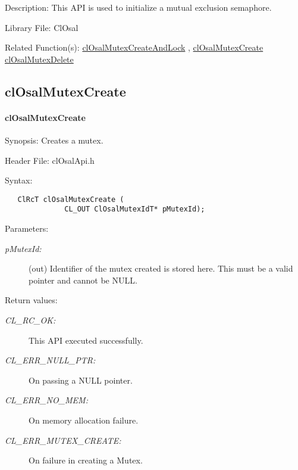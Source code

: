 \begin{Desc}
\item[Description:]This API is used to initialize a mutual exclusion semaphore.\end{Desc}
\begin{Desc}
\item[Library File:]Cl\-Osal\end{Desc}
\begin{Desc}
\item[Related Function(s):]\hyperlink{pageosal112}{cl\-Osal\-Mutex\-Create\-And\-Lock} , \hyperlink{pageosal111}{cl\-Osal\-Mutex\-Create} 
\hyperlink{pageosal115}{cl\-Osal\-Mutex\-Delete} \end{Desc}
\newpage



\subsection{clOsalMutexCreate}
\hypertarget{pageosal111}{}\paragraph{cl\-Osal\-Mutex\-Create}\label{pageosal111}
\begin{Desc}
\item[Synopsis:]Creates a mutex.\end{Desc}
\begin{Desc}
\item[Header File:]clOsalApi.h\end{Desc}
\begin{Desc}
\item[Syntax:]

\footnotesize\begin{verbatim}   ClRcT clOsalMutexCreate (
              CL_OUT ClOsalMutexIdT* pMutexId);
\end{verbatim}
\normalsize
\end{Desc}
\begin{Desc}
\item[Parameters:]
\begin{description}
\item[{\em p\-Mutex\-Id:}](out) Identifier of the mutex created is stored here. This must be a valid pointer and cannot be NULL.\end{description}
\end{Desc}
\begin{Desc}
\item[Return values:]
\begin{description}
\item[{\em CL\_\-RC\_\-OK:}]This API executed successfully. \item[{\em CL\_\-ERR\_\-NULL\_\-PTR:}]On passing a NULL pointer. \item[{\em CL\_\-ERR\_\-NO\_\-MEM:}]On memory allocation failure. \item[{\em CL\_\-ERR\_\-MUTEX\_\-CREATE:}]On failure in creating a Mutex.\end{description}
\end{Desc}
